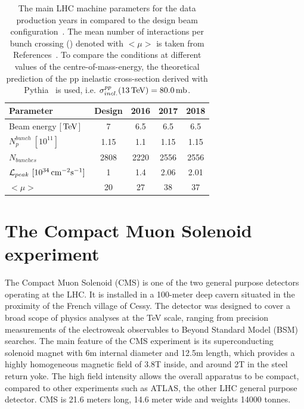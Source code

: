 \begin{table}
  \caption{The main LHC machine parameters for the data production years in \RunII{} compared to the design beam configuration~\cite{CERN-2004-003}.
  The mean number of interactions per bunch crossing (\pileup) denoted with $<\mu>$ is taken from References~\cite{CMS:LUM-17-003, CMS:LUM-17-004, CMS:LUM-18-002}.
  To compare the \pileup{} conditions at different values of the centre-of-mass-energy, the theoretical prediction of the pp inelastic cross-section derived with
  Pythia~\cite{Sjostrand:2015} is used, i.e. $\sigma^{pp}_{incl.}(13\,\text{Te\hspace{-.08em}V}) = 80.0\text{\,\text{mb}}$.}
  \label{tab:LHCparamsRun2}
  \centering
  \begin{tabular}{l c c c c}
    \toprule
    Parameter                & Design & 2016 & 2017 & 2018\\
    \midrule
    Beam energy [$\,\text{Te\hspace{-.08em}V}$]     &     7  &  6.5 &  6.5 &  6.5\\
    $N_p^{bunch}\ [10^{11}]$ &  1.15  & 1.1  & 1.15 & 1.15\\
    $N_{bunches}$            &  2808  & 2220 & 2556 & 2556\\
    $\mathcal{L}_{peak}\ [10^{34}\cm^{-2}\text{s}^{-1}]$ & 1 & 1.4 & 2.06 & 2.01\\
    $<\mu>$                  &    20  &   27 &   38 &   37\\
    \bottomrule
  \end{tabular}
\end{table}

\section{The Compact Muon Solenoid experiment}
The Compact Muon Solenoid (CMS) is one of the two general purpose detectors operating at the LHC.
It is installed in a 100-meter deep cavern situated in the proximity of the French village of Cessy.
The detector was designed to cover a broad scope of physics analyses at the TeV scale, ranging from precision measurements of the electroweak observables to Beyond Standard Model (BSM) searches.
The main feature of the CMS experiment is its superconducting solenoid magnet with 6\usep m internal diameter and 12.5\usep m length, which provides a highly homogeneous magnetic field of 3.8\usep T inside, and around 2\usep T in the steel return yoke.
The high field intensity allows the overall apparatus to be compact, compared to other experiments such as ATLAS, the other LHC general purpose detector.
CMS is 21.6 meters long, 14.6 meter wide and weights 14000 tonnes.


